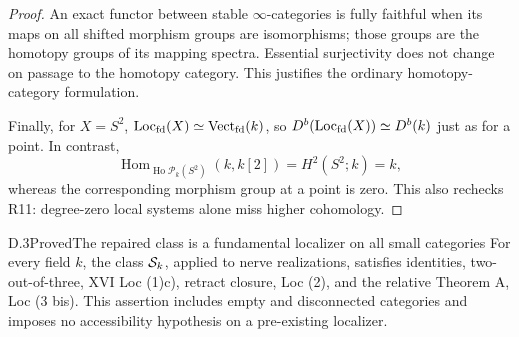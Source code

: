 \begin{proof}
An exact functor between stable $\infty$-categories is fully faithful
when its maps on all shifted morphism groups are isomorphisms; those
groups are the homotopy groups of its mapping spectra. Essential
surjectivity does not change on passage to the homotopy category. This
justifies the ordinary homotopy-category formulation.

Finally, for $X=S^2$, $\operatorname{Loc}_{\mathrm{fd}}(X)\simeq\operatorname{Vect}_{\mathrm{fd}}(k)$,
so $D^b(\operatorname{Loc}_{\mathrm{fd}}(X))\simeq D^b(k)$ just as for a point. In contrast,
\[
 \operatorname{Hom}_{\operatorname{Ho}\mathcal P_k(S^2)}(k,k[2])
       =H^2(S^2;k)=k,
\]
whereas the corresponding morphism group at a point is zero. This also
rechecks R11: degree-zero local systems alone miss higher cohomology.
\end{proof}

\begin{claim}{D.3}{Proved}{The repaired class is a fundamental localizer on all small categories}
\label{D3}
For every field $k$, the class $\mathcal S_k$, applied to nerve realizations,
satisfies identities, two-out-of-three, XVI Loc (1)c), retract closure,
Loc (2), and the relative Theorem A, Loc (3 bis). This assertion includes
empty and disconnected categories and imposes no accessibility
hypothesis on a pre-existing localizer.
\end{claim}
